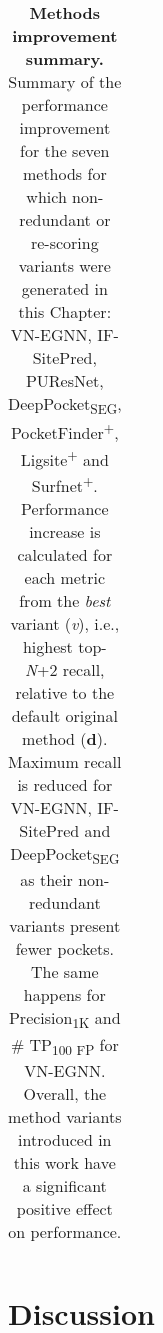 \begin{landscape}
\begin{longtable}[c]{|c|c|c|c|c|c|c|}
\caption[Methods improvement summary]{\textbf{Methods improvement summary.} Summary of the performance improvement for the seven methods for which non-redundant or re-scoring variants were generated in this Chapter: VN-EGNN, IF-SitePred, PUResNet, DeepPocket\textsubscript{SEG}, PocketFinder\textsuperscript{+}, Ligsite\textsuperscript{+} and Surfnet\textsuperscript{+}. Performance increase is calculated for each metric from the \textit{best} variant (\textit{v}), i.e., highest top-\textit{N}+2 recall, relative to the default original method (\textbf{d}). Maximum recall is reduced for VN-EGNN, IF-SitePred and DeepPocket\textsubscript{SEG} as their non-redundant variants present fewer pockets. The same happens for Precision\textsubscript{1K} and \# TP\textsubscript{100 FP} for VN-EGNN. Overall, the method variants introduced in this work have a significant positive effect on performance.}
\label{tab:methods_improvement_summary}\\
\end{longtable}
\end{landscape}

\section{Discussion}

